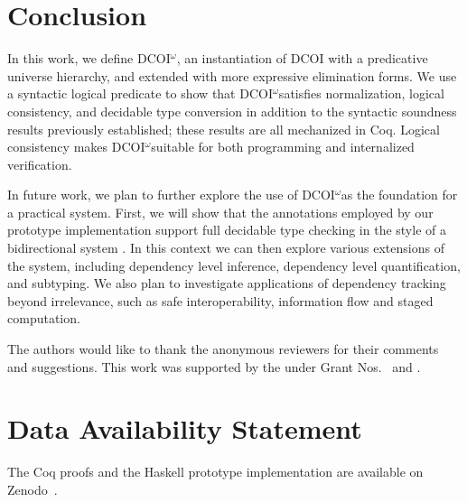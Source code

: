 \documentclass[acmsmall]{acmart}
\makeatletter
\theoremstyle{linked}
\theoremstyle{deflinked}
\theoremstyle{acmdefinition}
\newcommand{\sw}[1]{}
\newcommand{\jc}[1]{}
\newcommand{\dcoi}{DCOI\@\xspace}
\newcommand{\name}{\texorpdfstring{DCOI$^{\omega}$\@\xspace}{DCOI-omega}}
\makeatother
\begin{document}
\section{Conclusion}

In this work, we define \name, an instantiation of \dcoi with a
predicative universe hierarchy, and extended with more expressive
elimination forms. We use a syntactic logical predicate to show that
\name satisfies normalization, logical consistency, and decidable type
conversion in addition to the syntactic soundness results previously established; these results are all mechanized in Coq.
Logical consistency makes \name suitable for both
programming and internalized verification.
\jc{I don't think logical consistency says anything about programming
and we probably shouldn't mention information flow
if all of our examples have been about irrelevance?}
\sw{I removed information flow, but I'd like to get a hint of trellys
style termination modalities here...}

In future work, we plan to further explore the use of \name as the foundation for a practical system. First, we will show that the annotations employed by our prototype implementation support full
decidable type checking in the style of a bidirectional system
\citet{dunfield-krishnaswami:bidirection,adjedj:mltt-coq}. In this context we can then explore various extensions of the system, including dependency level inference, dependency level quantification, and subtyping. We also plan to investigate applications of dependency tracking beyond irrelevance, such as safe interoperability, information flow and staged computation. \sw{Also mention inductive datatypes? Prop sort? type-directed equality? }


\begin{acks}
The authors would like to thank the anonymous reviewers for their comments and suggestions.
This work was supported by the  under Grant Nos.~ and .
\end{acks}

\section*{Data Availability Statement}
The Coq proofs and the Haskell prototype implementation are available on Zenodo~\citep{dcoiartifact}.
\end{document}
